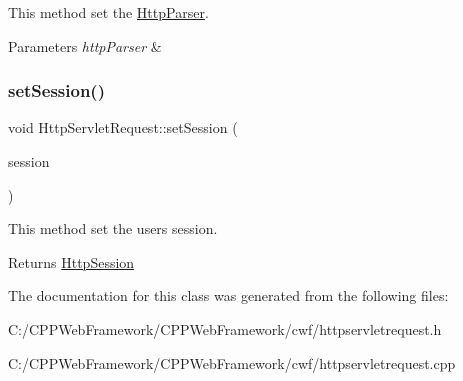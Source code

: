 This method set the \mbox{\hyperlink{class_http_parser}{Http\+Parser}}. 


\begin{DoxyParams}{Parameters}
{\em http\+Parser} & \\
\hline
\end{DoxyParams}
\mbox{\label{class_http_servlet_request_a52143e9c7db683d28ca9763d4357308a}} 
\subsubsection{\texorpdfstring{set\+Session()}{setSession()}}
{\footnotesize\ttfamily void Http\+Servlet\+Request\+::set\+Session (\begin{DoxyParamCaption}\item[{\mbox{\hyperlink{class_http_session}{Http\+Session}} \&}]{session }\end{DoxyParamCaption})}



This method set the user\textquotesingle{}s session. 

\begin{DoxyReturn}{Returns}
\mbox{\hyperlink{class_http_session}{Http\+Session}} 
\end{DoxyReturn}


The documentation for this class was generated from the following files\+:\begin{DoxyCompactItemize}
\item 
C\+:/\+C\+P\+P\+Web\+Framework/\+C\+P\+P\+Web\+Framework/cwf/httpservletrequest.\+h\item 
C\+:/\+C\+P\+P\+Web\+Framework/\+C\+P\+P\+Web\+Framework/cwf/httpservletrequest.\+cpp\end{DoxyCompactItemize}

